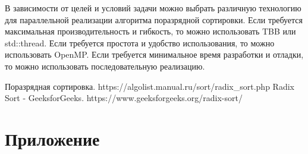 \documentclass{article}
\begin{document}
В зависимости от целей и условий задачи можно выбрать различную технологию для параллельной реализации алгоритма поразрядной сортировки. Если требуется максимальная производительность и гибкость, то можно использовать TBB или std::thread. Если требуется простота и удобство использования, то можно использовать OpenMP. Если требуется минимальное время разработки и отладки, то можно использовать последовательную реализацию.

\newpage
\begin{thebibliography}{9}  Поразрядная сортировка.
https://algolist.manual.ru/sort/radix\_sort.php
 Radix Sort - GeeksforGeeks. https://www.geeksforgeeks.org/radix-sort/ \end{thebibliography}

\newpage
\section{Приложение}
\end{document}
